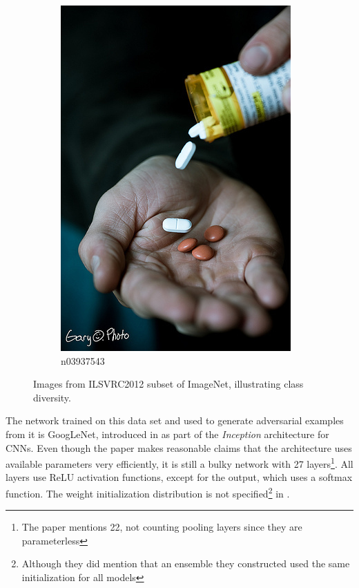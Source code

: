\documentclass[11pt, a4paper]{article}
\begin{document}
\begin{figure}[h!tb]
\begin{subfigure}[b]{0.30\textwidth}
        \includegraphics[width=\textwidth]{imagenet/examples/n03937543_10012.JPEG}
        \caption{n03937543}
        \label{fig:imagenet-examples-6}
    \end{subfigure}
    \caption{Images from ILSVRC2012 subset of ImageNet, illustrating class diversity.}
    \label{fig:imagenet-examples}
\end{figure}

The network trained on this data set and used to generate adversarial examples from it is GoogLeNet, introduced in \cite{going-deeper-with-convolutions} as part of the \emph{Inception} architecture for CNNs. Even though the paper makes reasonable claims that the architecture uses available parameters very efficiently, it is still a bulky network with 27 layers\footnote{The paper mentions 22, not counting pooling layers since they are parameterless}. All layers use ReLU activation functions, except for the output, which uses a softmax function. The weight initialization distribution is not specified\footnote{Although they did mention that an ensemble they constructed used the same initialization for all models} in \cite{going-deeper-with-convolutions}.
\end{document}
